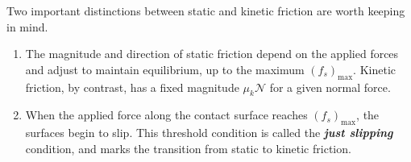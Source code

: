 Two important distinctions between static and kinetic friction are worth keeping in mind.
\vspace{-0.1cm}
\begin{enumerate}[leftmargin=2em, itemsep=2pt]
    \item The magnitude and direction of static friction depend on the applied forces and adjust to maintain equilibrium, up to the maximum $(f_s)_{\max}$. Kinetic friction, by contrast, has a fixed magnitude $\mu_k \mathscr{N}$ for a given normal force.
    \item When the applied force along the contact surface reaches $(f_s)_{\max}$, the surfaces begin to slip. This threshold condition is called the \textbf{\textit{just slipping}} condition, and marks the transition from static to kinetic friction.
\end{enumerate}

\vspace{0.3cm}


